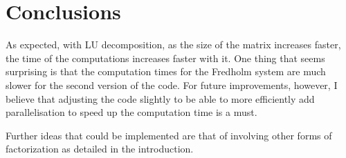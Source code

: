 \section{Conclusions}
As expected, with LU decomposition, as the size of the matrix increases faster, the time of the computations increases faster with it. One thing that seems surprising is that the computation times for the Fredholm system are much slower for the second version of the code.
For future improvements, however, I believe that adjusting the code slightly to be able to more efficiently add parallelisation to speed up the computation time is a must.

Further ideas that could be implemented are that of involving other forms of factorization as detailed in the introduction.
